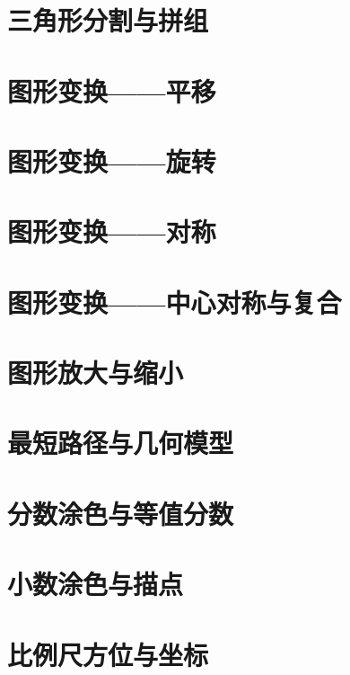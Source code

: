 \section{三角形分割与拼组}


\section{图形变换——平移}


\section{图形变换——旋转}


\section{图形变换——对称}


\section{图形变换——中心对称与复合}


\section{图形放大与缩小}


\section{最短路径与几何模型}


\section{分数涂色与等值分数}


\section{小数涂色与描点}


\section{比例尺方位与坐标}


